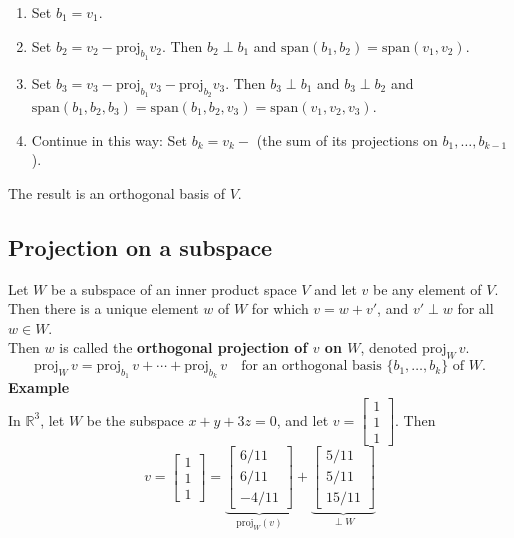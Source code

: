 \documentclass[a4paper, 9pt]{extarticle}
\begin{document}
\begin{enumerate}
  \item Set $b_1 = v_1$.
  \item Set $b_2 = v_2 - \text{proj}_{b_1} v_2$. Then $b_2 \perp b_1$ and
        $\text{span}(b_1, b_2) = \text{span}(v_1, v_2)$.
  \item Set $b_3 = v_3 - \text{proj}_{b_1} v_3 - \text{proj}_{b_2} v_3$.
        Then $b_3 \perp b_1$ and $b_3 \perp b_2$ and
        $\text{span}(b_1, b_2, b_3) = \text{span}(b_1, b_2, v_3) = \text{span}(v_1, v_2, v_3)$.
  \item Continue in this way: Set $b_k = v_k -$ (the sum of its projections on $b_1, \dots, b_{k-1}$).
\end{enumerate}

The result is an orthogonal basis of $V$.
\subsection{Projection on a subspace}
Let $W$ be a subspace of an inner product space $V$ and let $v$ be any element of $V$.\\
Then there is a unique element $w$ of $W$ for which
$v = w + v'$, and $v' \perp w$ for all $w \in W$. \\[2ex]
Then $w$ is called the \textbf{orthogonal projection of $v$ on $W$}, denoted $\text{proj}_W\,v$.
$$
  \text{proj}_W\,v = \text{proj}_{b_1}\,v + \cdots + \text{proj}_{b_k}\,v \quad \text{for an orthogonal basis } \{b_1, \dots, b_k\} \text{ of } W.
$$
\textbf{Example} \\
In $\mathbb{R}^3$, let $W$ be the subspace $x + y + 3z = 0$, and let $v = \begin{bmatrix} 1 \\ 1 \\ 1 \end{bmatrix}$.
Then
$$
  v = \begin{bmatrix} 1 \\ 1 \\ 1 \end{bmatrix}
  = \underbrace{\begin{bmatrix} 6/11 \\ 6/11 \\ -4/11 \end{bmatrix}}_{\text{proj}_W(v)}
  + \underbrace{\begin{bmatrix} 5/11 \\ 5/11 \\ 15/11 \end{bmatrix}}_{\perp W}
$$
\end{document}
